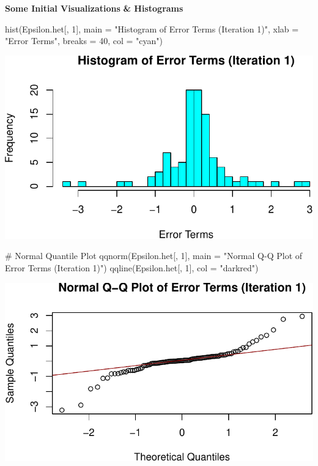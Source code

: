 \documentclass[
  11pt,
]{article}
\newenvironment{Shaded}{\begin{snugshade}}{\end{snugshade}}
\newcommand{\AttributeTok}[1]{\textcolor[rgb]{0.40,0.45,0.13}{#1}}
\newcommand{\CommentTok}[1]{\textcolor[rgb]{0.37,0.37,0.37}{#1}}
\newcommand{\DecValTok}[1]{\textcolor[rgb]{0.68,0.00,0.00}{#1}}
\newcommand{\FunctionTok}[1]{\textcolor[rgb]{0.28,0.35,0.67}{#1}}
\newcommand{\NormalTok}[1]{\textcolor[rgb]{0.00,0.23,0.31}{#1}}
\newcommand{\StringTok}[1]{\textcolor[rgb]{0.13,0.47,0.30}{#1}}
\begin{document}
\textbf{Some Initial Visualizations} \textbf{\& Histograms}

\begin{Shaded}
\begin{Highlighting}[]
\FunctionTok{hist}\NormalTok{(Epsilon.het[, }\DecValTok{1}\NormalTok{], }\AttributeTok{main =} \StringTok{"Histogram of Error Terms (Iteration 1)"}\NormalTok{, }
     \AttributeTok{xlab =} \StringTok{"Error Terms"}\NormalTok{, }\AttributeTok{breaks =} \DecValTok{40}\NormalTok{, }\AttributeTok{col =} \StringTok{"cyan"}\NormalTok{)}
\end{Highlighting}
\end{Shaded}

\includegraphics{HW-4-CODE-and-ANSWERS_files/figure-pdf/unnamed-chunk-17-1.pdf}

\begin{Shaded}
\begin{Highlighting}[]
\CommentTok{\# Normal Quantile Plot}
\FunctionTok{qqnorm}\NormalTok{(Epsilon.het[, }\DecValTok{1}\NormalTok{], }\AttributeTok{main =} \StringTok{"Normal Q{-}Q Plot of Error Terms (Iteration 1)"}\NormalTok{)}
\FunctionTok{qqline}\NormalTok{(Epsilon.het[, }\DecValTok{1}\NormalTok{], }\AttributeTok{col =} \StringTok{"darkred"}\NormalTok{)}
\end{Highlighting}
\end{Shaded}

\includegraphics{HW-4-CODE-and-ANSWERS_files/figure-pdf/unnamed-chunk-17-2.pdf}
\end{document}
